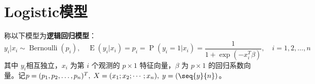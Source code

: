 \section{Logistic模型}

\begin{definition}\label{model:Logistic}
	称以下模型为\textbf{逻辑回归模型}：
	\begin{equation*}
		y_i|x_i\sim\operatorname{Bernoulli}(p_i),\quad
		\operatorname{E}(y_i|x_i)=p_i =\operatorname{P}(y_i=1|x_i) =  \frac{1}{1+\exp(-x_i^T\beta)}, \quad i=1,2,\dots,n
	\end{equation*}
	其中 $y_i$相互独立，$x_i$ 为第 $i$ 个观测的 $p\times 1$ 特征向量，$\beta$ 为 $p\times1$ 的回归系数向量。记$p = (p_1,p_2,\dots,p_n)^T,\;X=(x_1;x_2;\cdots;x_n),\;y=(\seq{y}{n})$。
\end{definition}

